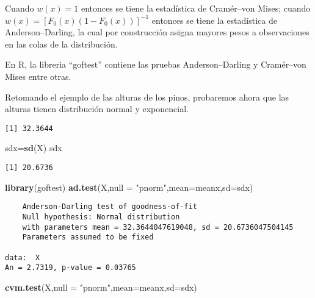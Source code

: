 \documentclass[
  a4paper,
  oneside,
  openany]{book}
\newenvironment{Shaded}{\begin{snugshade}}{\end{snugshade}}
\newcommand{\DataTypeTok}[1]{\textcolor[rgb]{0.13,0.29,0.53}{#1}}
\newcommand{\KeywordTok}[1]{\textcolor[rgb]{0.13,0.29,0.53}{\textbf{#1}}}
\newcommand{\NormalTok}[1]{#1}
\newcommand{\OperatorTok}[1]{\textcolor[rgb]{0.81,0.36,0.00}{\textbf{#1}}}
\newcommand{\StringTok}[1]{\textcolor[rgb]{0.31,0.60,0.02}{#1}}
\begin{document}
Cuando \(w(x)=1\) entonces se tiene la estadística de Cramér--von Mises; cuando \(w(x)=[F_0(x)(1-F_0(x))]^{-1}\) entonces se tiene la estadística de Anderson--Darling, la cual por construcción asigna mayores pesos a observaciones en las colas de la distribución.

En R, la libreria ``goftest'' contiene las pruebas Anderson--Darling y Cramér--von Mises entre otras.

Retomando el ejemplo de las alturas de los pinos, probaremos ahora que las alturas tienen distribución normal y exponencial.

\begin{Shaded}
\end{Shaded}

\begin{verbatim}
[1] 32.3644
\end{verbatim}

\begin{Shaded}
\begin{Highlighting}[]
\NormalTok{sdx=}\KeywordTok{sd}\NormalTok{(X)}
\NormalTok{sdx}
\end{Highlighting}
\end{Shaded}

\begin{verbatim}
[1] 20.6736
\end{verbatim}

\begin{Shaded}
\begin{Highlighting}[]
\KeywordTok{library}\NormalTok{(goftest)}
\KeywordTok{ad.test}\NormalTok{(X,}\DataTypeTok{null =} \StringTok{"pnorm"}\NormalTok{,}\DataTypeTok{mean=}\NormalTok{meanx,}\DataTypeTok{sd=}\NormalTok{sdx)}
\end{Highlighting}
\end{Shaded}

\begin{verbatim}
    Anderson-Darling test of goodness-of-fit
    Null hypothesis: Normal distribution
    with parameters mean = 32.3644047619048, sd = 20.6736047504145
    Parameters assumed to be fixed

data:  X
An = 2.7319, p-value = 0.03765
\end{verbatim}

\begin{Shaded}
\begin{Highlighting}[]
\KeywordTok{cvm.test}\NormalTok{(X,}\DataTypeTok{null =} \StringTok{"pnorm"}\NormalTok{,}\DataTypeTok{mean=}\NormalTok{meanx,}\DataTypeTok{sd=}\NormalTok{sdx)}
\end{Highlighting}
\end{Shaded}
\end{document}
